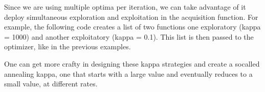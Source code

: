 \documentclass[letterpaper,12pt,english]{sphinxmanual}
\begin{document}
\begin{sphinxVerbatim}[commandchars=\\\{\}]
  
                                   
\end{sphinxVerbatim}

\sphinxAtStartPar
Since we are using multiple optima per iteration, we can take advantage of it deploy simultaneous exploration and
exploitation in the acquisition function. For example, the following code creates a list of two functions \textendash{} one
exploratory (kappa = 1000) and another exploitatory (kappa = 0.1). This list is then passed to the optimizer, like in
the previous examples.

\begin{sphinxVerbatim}[commandchars=\\\{\}]
  
  \PYG{p}{[}\PYG{p}{]}
              
               
\end{sphinxVerbatim}

\sphinxAtStartPar
One can get more crafty in designing these kappa strategies and create a so\sphinxhyphen{}called annealing kappa, one that starts with
a large value and eventually reduces to a small value, at different rates.
\end{document}
